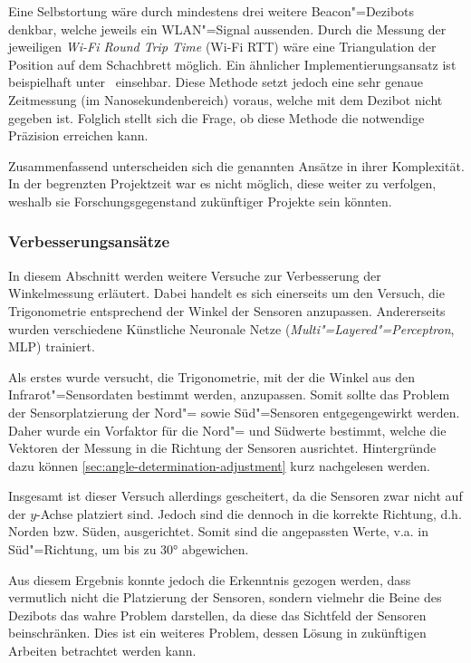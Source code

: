 {Eine Selbstortung wäre durch mindestens drei weitere Beacon"=Dezibots denkbar, welche jeweils ein WLAN"=Signal aussenden. Durch die Messung der jeweiligen \emph{Wi-Fi Round Trip Time} (Wi-Fi RTT) wäre eine Triangulation der Position auf dem Schachbrett möglich. Ein ähnlicher Implementierungsansatz ist beispielhaft unter~\cite{espressifsystemsshanghaico.ltdFTMExample2024} einsehbar. Diese Methode setzt jedoch eine sehr genaue Zeitmessung (im Nanosekundenbereich) voraus, welche mit dem Dezibot nicht gegeben ist. Folglich stellt sich die Frage, ob diese Methode die notwendige Präzision erreichen kann.


Zusammenfassend unterscheiden sich die genannten Ansätze in ihrer Komplexität. In der begrenzten Projektzeit war es nicht möglich, diese weiter zu verfolgen, weshalb sie Forschungsgegenstand zukünftiger Projekte sein könnten.


\subsubsection{Verbesserungsansätze}
\label{sec:ir-rotation-improvements}

In diesem Abschnitt werden weitere Versuche zur Verbesserung der Winkelmessung erläutert. Dabei handelt es sich einerseits um den Versuch, die Trigonometrie entsprechend der Winkel der Sensoren anzupassen. Andererseits wurden verschiedene Künstliche Neuronale Netze (\emph{Multi"=Layered"=Perceptron}, MLP) trainiert.


Als erstes wurde versucht, die Trigonometrie, mit der die Winkel aus den Infrarot"=Sensordaten bestimmt werden, anzupassen. Somit sollte das Problem der Sensorplatzierung der Nord"= sowie Süd"=Sensoren entgegengewirkt werden. Daher wurde ein Vorfaktor für die Nord"= und Südwerte bestimmt, welche die Vektoren der Messung in die Richtung der Sensoren ausrichtet. Hintergründe dazu können \autoref{sec:angle-determination-adjustment} kurz nachgelesen werden.

Insgesamt ist dieser Versuch allerdings gescheitert, da die Sensoren zwar nicht auf der $y$-Achse platziert sind. Jedoch sind die dennoch in die korrekte Richtung, d.h. Norden bzw. Süden, ausgerichtet. Somit sind die angepassten Werte, v.a. in Süd"=Richtung, um bis zu 30° abgewichen.

Aus diesem Ergebnis konnte jedoch die Erkenntnis gezogen werden, dass vermutlich nicht die Platzierung der Sensoren, sondern vielmehr die Beine des Dezibots das wahre Problem darstellen, da diese das Sichtfeld der Sensoren beinschränken. Dies ist ein weiteres Problem, dessen Lösung in zukünftigen Arbeiten betrachtet werden kann.

}
